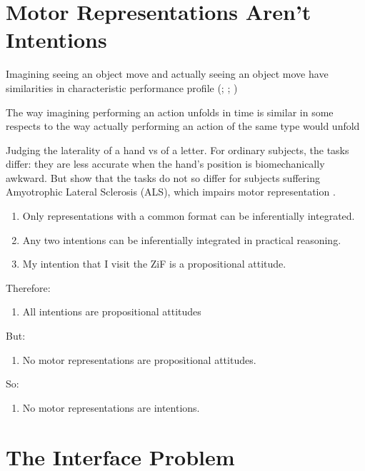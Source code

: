\documentclass[12pt]{extarticle}
\begin{document}
\begin{multicols*}{3}
\section{Motor Representations Aren’t Intentions}

Imagining seeing an object move and actually seeing an object move have similarities in
characteristic performance profile
(\citealp{kosslyn:1978_measuring}; \citealp[p.\ 99ff]{kosslyn:1994_image}; \citealp{kosslyn:1978_visual})

The way imagining performing an action unfolds in time is
similar in some respects to the way actually performing an action of the same type would unfold
\citep{decety:1989_timing, Jeannerod:1994oz, parsons:1994_temporal,
frak:2001_orientation}

Judging the laterality of a hand vs of a letter.
For ordinary subjects, the tasks differ: they are less accurate
when the hand's position is biomechanically awkward.
But \citet{Fiori:2012fk} show that the tasks do not so differ for subjects suffering Amyotrophic
Lateral Sclerosis (ALS), which impairs motor representation \citep{parsons:1998_cerebrally}.

\begin{enumerate}
\item Only representations with a common format can be inferentially integrated.
\item Any two intentions can be inferentially integrated in practical reasoning.
\item My intention that I visit the ZiF is a propositional attitude.
\end{enumerate}
Therefore:
\begin{enumerate}[resume]
\item  All intentions are propositional attitudes
\end{enumerate}
But:
\begin{enumerate}[resume]
\item No motor representations are propositional attitudes.
\end{enumerate}
So:
\begin{enumerate}[resume]
\item No motor representations are intentions.
\end{enumerate}



\section{The Interface Problem}


\end{multicols*}
\end{document}
